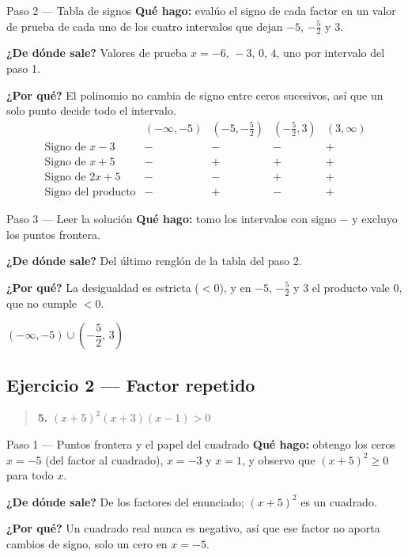 \documentclass[11pt]{article}
\begin{document}
\begin{paso}{Paso 2 --- Tabla de signos}
\textbf{Qué hago:} evalúo el signo de cada factor en un valor de prueba de cada uno de los cuatro intervalos que dejan $-5$, $-\frac52$ y $3$.

\textbf{¿De dónde sale?} Valores de prueba $x=-6,\,-3,\,0,\,4$, uno por intervalo del paso 1.

\textbf{¿Por qué?} El polinomio no cambia de signo entre ceros sucesivos, así que un solo punto decide todo el intervalo.
\[
\begin{array}{l|cccc}
 & (-\infty,-5) & (-5,-\tfrac52) & (-\tfrac52,3) & (3,\infty)\\\hline
\text{Signo de } x-3 & - & - & - & +\\
\text{Signo de } x+5 & - & + & + & +\\
\text{Signo de } 2x+5 & - & - & + & +\\\hline
\text{Signo del producto} & - & + & - & +
\end{array}
\]
\end{paso}

\begin{paso}{Paso 3 --- Leer la solución}
\textbf{Qué hago:} tomo los intervalos con signo $-$ y excluyo los puntos frontera.

\textbf{¿De dónde sale?} Del último renglón de la tabla del paso 2.

\textbf{¿Por qué?} La desigualdad es estricta ($<0$), y en $-5$, $-\frac52$ y $3$ el producto vale $0$, que no cumple $<0$.
\end{paso}

\begin{resp}
$(-\infty,-5)\cup\left(-\dfrac{5}{2},\,3\right)$
\end{resp}

\subsection*{Ejercicio 2 — Factor repetido}

\begin{quote}
\textbf{5.} $(x+5)^2(x+3)(x-1)>0$
\end{quote}

\begin{paso}{Paso 1 --- Puntos frontera y el papel del cuadrado}
\textbf{Qué hago:} obtengo los ceros $x=-5$ (del factor al cuadrado), $x=-3$ y $x=1$, y observo que $(x+5)^2\ge 0$ para todo $x$.

\textbf{¿De dónde sale?} De los factores del enunciado; $(x+5)^2$ es un cuadrado.

\textbf{¿Por qué?} Un cuadrado real nunca es negativo, así que ese factor no aporta cambios de signo, solo un cero en $x=-5$.
\end{paso}
\end{document}

